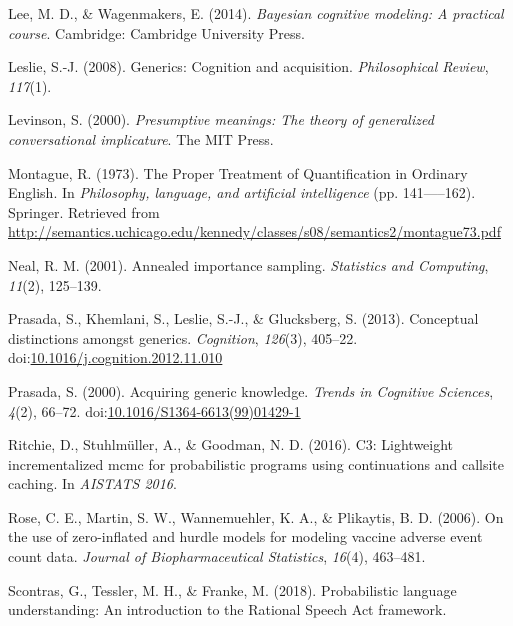 \documentclass[floatsintext,doc]{apa6}
\begin{document}
\leavevmode\hypertarget{ref-LeeWagenmakers2014}{}%
Lee, M. D., \& Wagenmakers, E. (2014). \emph{Bayesian cognitive modeling: A practical course}. Cambridge: Cambridge University Press.

\leavevmode\hypertarget{ref-Leslie2008}{}%
Leslie, S.-J. (2008). Generics: Cognition and acquisition. \emph{Philosophical Review}, \emph{117}(1).

\leavevmode\hypertarget{ref-Levinson2000}{}%
Levinson, S. (2000). \emph{Presumptive meanings: The theory of generalized conversational implicature}. The MIT Press.

\leavevmode\hypertarget{ref-Montague1973}{}%
Montague, R. (1973). The Proper Treatment of Quantification in Ordinary English. In \emph{Philosophy, language, and artificial intelligence} (pp. 141-----162). Springer. Retrieved from \url{http://semantics.uchicago.edu/kennedy/classes/s08/semantics2/montague73.pdf}

\leavevmode\hypertarget{ref-neal2001annealed}{}%
Neal, R. M. (2001). Annealed importance sampling. \emph{Statistics and Computing}, \emph{11}(2), 125--139.

\leavevmode\hypertarget{ref-Prasada2013}{}%
Prasada, S., Khemlani, S., Leslie, S.-J., \& Glucksberg, S. (2013). Conceptual distinctions amongst generics. \emph{Cognition}, \emph{126}(3), 405--22. doi:\href{https://doi.org/10.1016/j.cognition.2012.11.010}{10.1016/j.cognition.2012.11.010}

\leavevmode\hypertarget{ref-Prasada2000}{}%
Prasada, S. (2000). Acquiring generic knowledge.  \emph{Trends in Cognitive Sciences}, \emph{4}(2), 66--72. doi:\href{https://doi.org/10.1016/S1364-6613(99)01429-1}{10.1016/S1364-6613(99)01429-1}

\leavevmode\hypertarget{ref-Ritchie2016}{}%
Ritchie, D., Stuhlmüller, A., \& Goodman, N. D. (2016). C3: Lightweight incrementalized mcmc for probabilistic programs using continuations and callsite caching. In \emph{AISTATS 2016}.

\leavevmode\hypertarget{ref-hurdleModels}{}%
Rose, C. E., Martin, S. W., Wannemuehler, K. A., \& Plikaytis, B. D. (2006). On the use of zero-inflated and hurdle models for modeling vaccine adverse event count data. \emph{Journal of Biopharmaceutical Statistics}, \emph{16}(4), 463--481.

\leavevmode\hypertarget{ref-problang}{}%
Scontras, G., Tessler, M. H., \& Franke, M. (2018). Probabilistic language understanding: An introduction to the Rational Speech Act framework.
\end{document}

